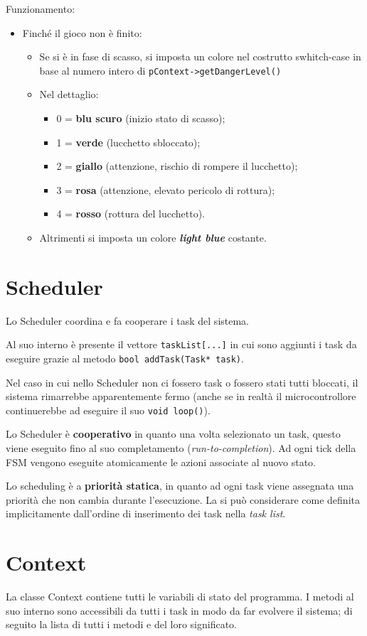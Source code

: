Funzionamento:
\begin{itemize}
	\item Finché il gioco non è finito:
	\begin{itemize}
		\item Se si è in fase di scasso, si imposta un colore nel costrutto swhitch-case in base al numero intero di \texttt{pContext->getDangerLevel()}
			\item Nel dettaglio:
			\begin{itemize}
				\item 0 = \textbf{blu scuro} (inizio stato di scasso); 
				\item 1 = \textbf{verde} (lucchetto sbloccato);
				\item 2 = \textbf{giallo} (attenzione, rischio di rompere il lucchetto);
				\item 3 = \textbf{rosa} (attenzione, elevato pericolo di rottura);
				\item 4 = \textbf{rosso} (rottura del lucchetto).
			\end{itemize}
		\item Altrimenti si imposta un colore \textbf{\textit{light blue}} costante.
	\end{itemize}
\end{itemize}

\section{Scheduler}
Lo Scheduler coordina e fa cooperare i task del sistema.

Al suo interno è presente il vettore \texttt{taskList[...]} in cui sono aggiunti i task da eseguire grazie al metodo \texttt{bool addTask(Task* task)}.

Nel caso in cui nello Scheduler non ci fossero task o fossero stati tutti bloccati, il sistema rimarrebbe apparentemente fermo (anche se in realtà il microcontrollore continuerebbe ad eseguire il suo \texttt{void loop()}).

Lo Scheduler è \textbf{cooperativo} in quanto una volta selezionato un task, questo viene eseguito fino al suo completamento (\textit{run-to-completion}). Ad ogni tick della FSM vengono eseguite atomicamente le azioni associate al nuovo stato.

Lo scheduling è a \textbf{priorità statica}, in quanto ad ogni task viene assegnata una priorità che non cambia durante l'esecuzione. La si può considerare come definita implicitamente dall'ordine di inserimento dei task nella \textit{task list}.

\section{Context}\label{sec:contextgeneric}
La classe Context contiene tutti le variabili di stato del programma. I metodi al suo interno sono accessibili da tutti i task in modo da far evolvere il sistema; di seguito la lista di tutti i metodi e del loro significato.



